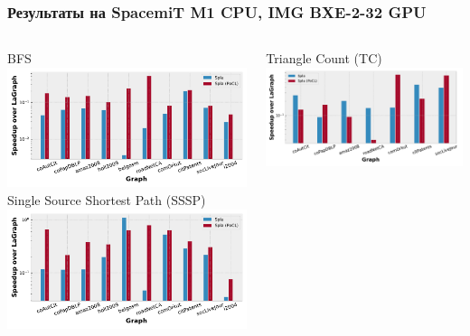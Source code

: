 \documentclass[xcolor=table,aspectratio=169]{beamer}
\begin{document}
\begin{frame}
  \frametitle{Результаты на SpacemiT M1 CPU, IMG BXE-2-32 GPU}

\begin{columns}
        \vspace{-0.5cm}
        \begin{center}
          BFS \\
        \includegraphics[width=0.909\linewidth]{pictures/rq1_rel_bfs.pdf}
        Single Source Shortest Path (SSSP) \\
        \includegraphics[width=0.909\linewidth]{pictures/rq1_rel_sssp.pdf}
        \end{center}
        \vspace{-0.5cm}
        \begin{center}
          Triangle Count (TC) \\
        \includegraphics[width=0.9\linewidth]{pictures/rq1_rel_tc.pdf}

\end{center}
\end{columns}
\end{frame}
\end{document}
